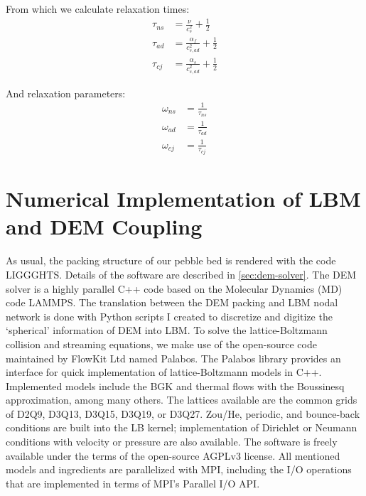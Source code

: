 From which we calculate relaxation times:
\begin{align*}
	\tau_{ns} &= \frac{\nu}{c_s^2} + \frac{1}{2} \\
	\tau_{ad} &= \frac{\alpha_f}{c_{s,ad}^2} + \frac{1}{2} \\
	\tau_{cj} &= \frac{\alpha_s}{c_{s,ad}^2} + \frac{1}{2}
\end{align*}

And relaxation parameters:
\begin{align*}
	\omega_{ns} &= \frac{1}{\tau_{ns}} \\
	\omega_{ad} &= \frac{1}{\tau_{ad}} \\
	\omega_{cj} &= \frac{1}{\tau_{cj}}
\end{align*}



\section{Numerical Implementation of LBM and DEM Coupling}\label{sec:lbm-solver}

As usual, the packing structure of our pebble bed is rendered with the code LIGGGHTS. Details of the software are described in \cref{sec:dem-solver}. The DEM solver is a highly parallel C++ code based on the Molecular Dynamics (MD) code LAMMPS.\cite{Plimpton1995} The translation between the DEM packing and LBM nodal network is done with Python scripts I created to discretize and digitize the `spherical' information of DEM into LBM. To solve the lattice-Boltzmann collision and streaming equations, we make use of the open-source code maintained by FlowKit Ltd named Palabos.\cite{Flow} The Palabos library provides an interface for quick implementation of lattice-Boltzmann models in C++. Implemented models include the BGK and thermal flows with the Boussinesq approximation, among many others. The lattices available are the common grids of D2Q9, D3Q13, D3Q15, D3Q19, or D3Q27. Zou/He, periodic, and bounce-back conditions are built into the LB kernel; implementation of Dirichlet or Neumann conditions with velocity or pressure are also available. The software is freely available under the terms of the open-source AGPLv3 license.\cite{FreeSoftwareFoundationInc.2007} All mentioned models and ingredients are parallelized with MPI, including the I/O operations that are implemented in terms of MPI’s Parallel I/O API.









